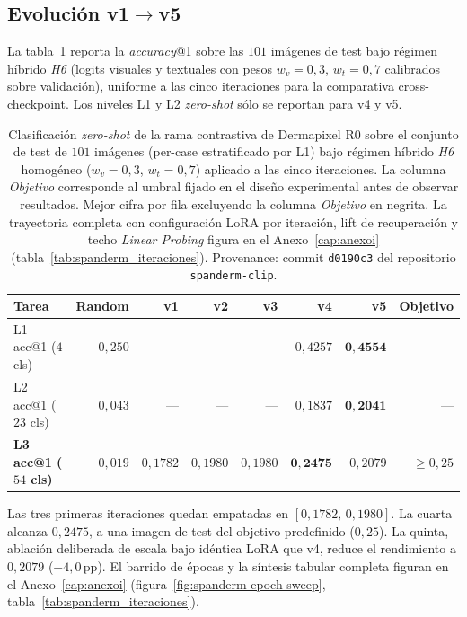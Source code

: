 \subsection{Evolución v1$\to$v5}

La tabla~\ref{tab:spanderm-zs} reporta la \emph{accuracy}@1 sobre las
$101$ imágenes de test bajo régimen híbrido \emph{H6} (logits visuales
y textuales con pesos $w_v = 0{,}3$, $w_t = 0{,}7$ calibrados sobre
validación), uniforme a las cinco iteraciones para la comparativa
cross-checkpoint. Los niveles L1 y L2 \emph{zero-shot} sólo se reportan
para v4 y v5.

\begin{table}[H]
\centering
\footnotesize
\setlength{\tabcolsep}{3pt}
\renewcommand{\arraystretch}{0.95}
\caption{Clasificación \emph{zero-shot} de la rama contrastiva de
Dermapixel R0 sobre el
conjunto de test de $101$ imágenes (per-case estratificado por
L1) bajo régimen híbrido \emph{H6} homogéneo
($w_v = 0{,}3$, $w_t = 0{,}7$) aplicado a las cinco iteraciones.
La columna \emph{Objetivo} corresponde al umbral fijado en el
diseño experimental antes de observar resultados. Mejor cifra
por fila excluyendo la columna \emph{Objetivo} en negrita.
La trayectoria completa con configuración LoRA por iteración,
lift de recuperación y techo \emph{Linear Probing} figura en el
Anexo~\ref{cap:anexoi}
(tabla~\ref{tab:spanderm_iteraciones}).
Provenance: commit \texttt{d0190c3} del repositorio
\texttt{spanderm-clip}.}
\label{tab:spanderm-zs}
\begin{tabular}{lrrrrrrr}
\hline
Tarea                        & Random    & v1                  & v2                  & v3                  & v4                  & v5                  & Objetivo \\
\hline
L1 acc@1 ($4$ cls)            & $0{,}250$ & ---                 & ---                 & ---                 & $0{,}4257$          & $\mathbf{0{,}4554}$ & ---           \\
L2 acc@1 ($23$ cls)           & $0{,}043$ & ---                 & ---                 & ---                 & $0{,}1837$          & $\mathbf{0{,}2041}$ & ---           \\
\textbf{L3 acc@1 ($54$ cls)}  & $0{,}019$ & $0{,}1782$          & $0{,}1980$          & $0{,}1980$          & $\mathbf{0{,}2475}$ & $0{,}2079$          & $\geq 0{,}25$ \\
\hline
\end{tabular}
\end{table}

Las tres primeras iteraciones quedan empatadas en
$[0{,}1782,\,0{,}1980]$. La cuarta alcanza $0{,}2475$, a una imagen de
test del objetivo predefinido ($0{,}25$). La quinta, ablación
deliberada de escala bajo idéntica LoRA que v4, reduce el rendimiento a
$0{,}2079$ ($-4{,}0$\,pp). El barrido de épocas y la síntesis tabular
completa figuran en el Anexo~\ref{cap:anexoi}
(figura~\ref{fig:spanderm-epoch-sweep},
tabla~\ref{tab:spanderm_iteraciones}).

